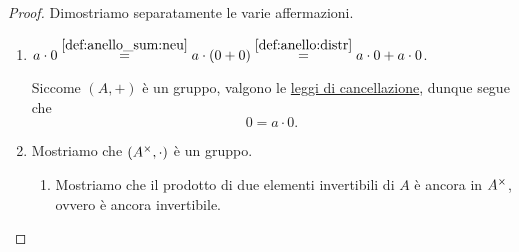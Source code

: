 \begin{proof}
    Dimostriamo separatamente le varie affermazioni.
    \begin{enumerate}[label={(\roman*)}]
        \item $a \cdot 0 \stackrel{\ref{def:anello_sum:neu}}{=} a \cdot (0 + 0) \stackrel{\ref{def:anello:distr}}{=} a \cdot 0 + a \cdot 0$.
        
        Siccome $(A, +)$ è un gruppo, valgono le \hyperref[prop:prop_grp:canc]{leggi di cancellazione}, dunque segue che \[
            0 = a \cdot 0.    
        \]
        \item Mostriamo che $(A^{\times}, \cdot)$ è un gruppo.
        \begin{enumerate}[label={(G\arabic*)}]
            \item Mostriamo che il prodotto di due elementi invertibili di $A$ è ancora in $A^{\times}$, ovvero è ancora invertibile.
            

\end{enumerate}
\end{enumerate}
\end{proof}
